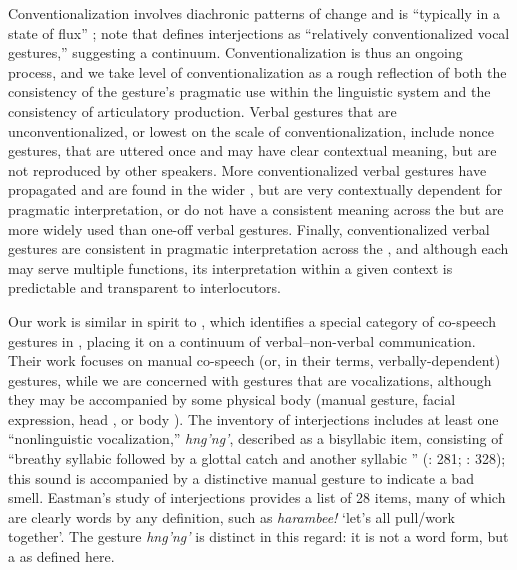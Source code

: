 \documentclass[output=paper
,newtxmath
,modfonts
,nonflat]{langsci/langscibook}
\begin{document}
Conventionalization involves diachronic patterns of change and is ``typically in a state of flux'' \citep[27]{ferguson1994}; note that \citet[106]{ameka1992} defines interjections as ``relatively conventionalized vocal gestures,'' suggesting a continuum. Conventionalization is thus an ongoing process,  and we take level of conventionalization as a rough reflection of both the consistency of the gesture's pragmatic use within the linguistic system and the consistency of articulatory production. Verbal gestures that are unconventionalized, or lowest on the scale of conventionalization, include nonce gestures, that are uttered once and may have clear contextual meaning, but are not   reproduced by other speakers. More conventionalized verbal gestures have propagated and are found in the wider , but are very contextually dependent  for  pragmatic interpretation, or do not have a consistent meaning across the  but are more widely used than one-off verbal gestures. Finally, conventionalized verbal gestures are consistent in  pragmatic interpretation across the , and although each  may serve multiple functions, its interpretation within a given context is predictable and transparent to interlocutors.
  
Our work is similar in spirit to \citet{eastmanomar1985}, which identifies a special category of co-speech gestures in , placing it on a continuum of verbal--non-verbal communication.  Their work focuses on manual co-speech (or, in their terms, verbally-dependent) gestures, while we are concerned with gestures that are vocalizations, although they may be accompanied by some physical body  (manual gesture, facial expression, head , or body ). The inventory of  interjections includes at least one  ``nonlinguistic vocalization,'' \textit{hng'ng'}, described as a bisyllabic item, consisting of  ``breathy syllabic  followed by a glottal catch and another syllabic '' (\citealt{eastman1992}: 281; \citealt{eastmanomar1985}: 328); this sound is accompanied by a distinctive manual gesture to indicate a bad smell. Eastman's study of  interjections provides a list of 28 items, many of which are clearly words by any definition, such as \textit{harambee!} `let's all pull/work together'. The gesture \textit{hng'ng'} is distinct in this regard: it is not a word form, but a  as defined here.
\end{document}
